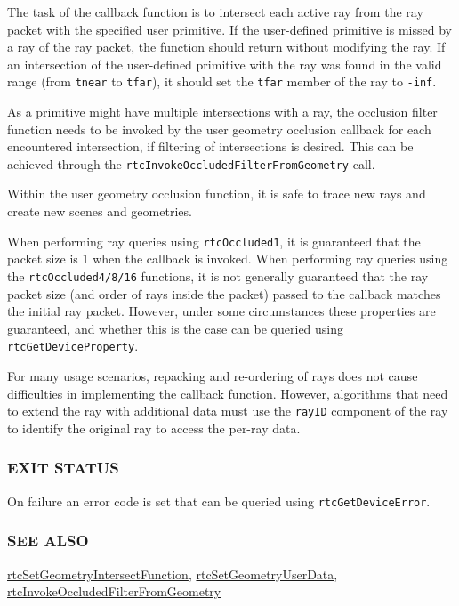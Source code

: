 The task of the callback function is to intersect each active ray from
the ray packet with the specified user primitive. If the user-defined
primitive is missed by a ray of the ray packet, the function should
return without modifying the ray. If an intersection of the user-defined
primitive with the ray was found in the valid range (from \texttt{tnear}
to \texttt{tfar}), it should set the \texttt{tfar} member of the ray to
\texttt{-inf}.

As a primitive might have multiple intersections with a ray, the
occlusion filter function needs to be invoked by the user geometry
occlusion callback for each encountered intersection, if filtering of
intersections is desired. This can be achieved through the
\texttt{rtcInvokeOccludedFilterFromGeometry} call.

Within the user geometry occlusion function, it is safe to trace new
rays and create new scenes and geometries.

When performing ray queries using \texttt{rtcOccluded1}, it is
guaranteed that the packet size is 1 when the callback is invoked. When
performing ray queries using the \texttt{rtcOccluded4/8/16} functions,
it is not generally guaranteed that the ray packet size (and order of
rays inside the packet) passed to the callback matches the initial ray
packet. However, under some circumstances these properties are
guaranteed, and whether this is the case can be queried using
\texttt{rtcGetDeviceProperty}.

For many usage scenarios, repacking and re-ordering of rays does not
cause difficulties in implementing the callback function. However,
algorithms that need to extend the ray with additional data must use the
\texttt{rayID} component of the ray to identify the original ray to
access the per-ray data.

\subsubsection{EXIT STATUS}\label{exit-status}

On failure an error code is set that can be queried using
\texttt{rtcGetDeviceError}.

\subsubsection{SEE ALSO}\label{see-also}

\hyperref[rtcsetgeometryintersectfunction]{rtcSetGeometryIntersectFunction},
\hyperref[rtcsetgeometryuserdata]{rtcSetGeometryUserData},
\hyperref[rtcinvokeoccludedfilterfromgeometry]{rtcInvokeOccludedFilterFromGeometry}

